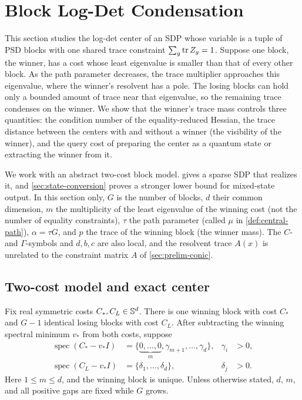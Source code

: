 \section{Block Log-Det Condensation}
\label{sec:condensation}

This section studies the log-det center of an SDP whose variable is a tuple
of PSD blocks with one shared trace constraint $\sum_g\operatorname{tr} Z_g=1$.  Suppose
one block, the winner, has a cost whose least eigenvalue is smaller than
that of every other block.  As the path parameter decreases, the trace
multiplier approaches this eigenvalue, where the winner's resolvent has a
pole.  The losing blocks can hold only a bounded amount of trace near that
eigenvalue, so the remaining trace condenses on the winner.  We show that
the winner's trace mass controls three quantities: the condition number of
the equality-reduced Hessian, the trace distance
between the centers with and without a winner (the visibility of the
winner), and the query cost of preparing the center as a quantum state or
extracting the winner from it.

We work with an abstract two-cost block model.  
gives a sparse SDP that realizes it, and \cref{sec:state-conversion} proves
a stronger lower bound for mixed-state output.  In this section only, $G$ is
the number of blocks, $d$ their common dimension, $m$ the multiplicity of
the least eigenvalue of the winning cost (not the number of equality
constraints), $\tau$ the path parameter (called $\mu$ in
\cref{def:central-path}), $\alpha=\tau G$, and $p$ the trace of the winning
block (the winner mass).  The $C$- and $\Gamma$-symbols and $d,b,c$ are also
local, and the resolvent trace $A(x)$ is unrelated to the constraint matrix
$A$ of \cref{sec:prelim-conic}.
\newcommand{\condtag}[1]{\tag{#1}}

\subsection{Two-cost model and exact center}
\label{sec:condensation-model}

Fix real symmetric costs $C_*,C_L\in\mathbb{S}^d$.  There is one winning block
with cost $C_*$ and $G-1$ identical losing blocks with cost $C_L$.  After
subtracting the winning spectral minimum $v_*$ from both costs, suppose
\begin{align}
 \operatorname{spec}(C_*-v_*I)
  &=\{\underbrace{0,\ldots,0}_{m},\gamma_{m+1},\ldots,\gamma_d\},
   &\gamma_i&>0,                                             \label{eq:cond-winner-spectrum}\\
 \operatorname{spec}(C_L-v_*I)
  &=\{\delta_1,\ldots,\delta_d\},
   &\delta_j&>0.                                             \label{eq:cond-loser-spectrum}
\end{align}
Here $1\le m\le d$, and the winning block is unique.  Unless otherwise
stated, $d$, $m$, and all positive gaps are fixed while $G$ grows.

